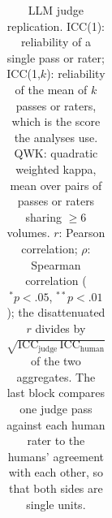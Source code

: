 \begin{table}[t]
\begin{tabular}{lcccc}
  \end{tabular}
  \caption{LLM judge replication.  ICC(1): reliability of a single
           pass or rater; ICC(1,$k$): reliability of the mean of $k$
           passes or raters, which is the score the analyses use.  QWK:
           quadratic weighted kappa, mean over pairs of passes or raters
           sharing $\geq 6$ volumes.  $r$: Pearson correlation; $\rho$:
           Spearman correlation ($^{*}p<.05$, $^{**}p<.01$); the
           disattenuated $r$ divides by
           $\sqrt{\mathrm{ICC}_{\text{judge}}\,\mathrm{ICC}_{\text{human}}}$
           of the two aggregates.  The last block compares one judge
           pass against each human rater to the humans' agreement with
           each other, so that both sides are single units.}
  \label{tab:judge}
\end{table}